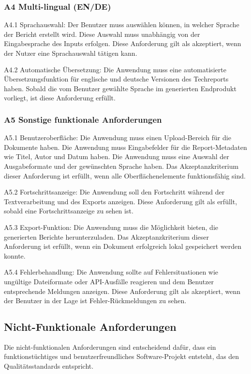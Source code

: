 \subsubsection{A4 Multi-lingual (EN/DE)}
A4.1 Sprachauswahl: Der Benutzer muss auswählen können, in welcher Sprache der Bericht erstellt wird. Diese Auswahl muss unabhängig von der Eingabesprache des Inputs erfolgen. Diese Anforderung gilt als akzeptiert, wenn der Nutzer eine Sprachauswahl tätigen kann.

A4.2 Automatische Übersetzung: Die Anwendung muss eine automatisierte Übersetzungsfunktion für englische und deutsche Versionen des Techreports haben. Sobald die vom Benutzer gewählte Sprache im generierten Endprodukt vorliegt, ist diese Anforderung erfüllt.

\subsubsection{A5 Sonstige funktionale Anforderungen}
A5.1 Benutzeroberfläche: Die Anwendung muss einen Upload-Bereich für die Dokumente haben. Die Anwendung muss Eingabefelder für die Report-Metadaten wie Titel, Autor und Datum haben. Die Anwendung muss eine Auswahl der Ausgabeformate und der gewünschten Sprache haben. Das Akzeptanzkriterium dieser Anforderung ist erfüllt, wenn alle Oberflächenelemente funktionsfähig sind.
    
A5.2 Fortschrittsanzeige: Die Anwendung soll den Fortschritt während der Textverarbeitung und des Exports anzeigen. Diese Anforderung gilt als erfüllt, sobald eine Fortschrittsanzeige zu sehen ist.

A5.3 Export-Funktion: Die Anwendung muss die Möglichkeit bieten, die generierten Berichte herunterzuladen. Das Akzeptanzkriterium dieser Anforderung ist erfüllt, wenn ein Dokument erfolgreich lokal gespeichert werden konnte.

A5.4 Fehlerbehandlung: Die Anwendung sollte auf Fehlersituationen wie ungültige Dateiformate oder \ac{API}-Ausfälle reagieren und dem Benutzer entsprechende Meldungen anzeigen. Diese Anforderung gilt als akzeptiert, wenn der Benutzer in der Lage ist Fehler-Rückmeldungen zu sehen.

\subsection{Nicht-Funktionale Anforderungen}
Die nicht-funktionalen Anforderungen sind entscheidend dafür, dass ein funktionstüchtiges und benutzerfreundliches Software-Projekt entsteht, das den Qualitätsstandards entspricht. \cite[S.77]{kleuker2013anforderungsanalyse}

